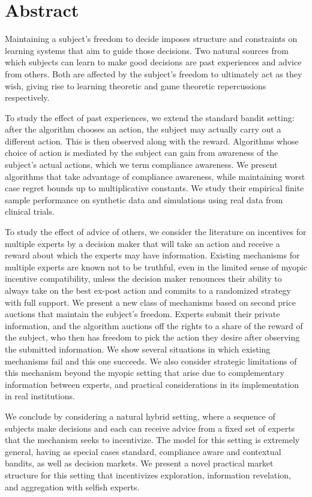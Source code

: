 \chapter*{Abstract}
\vspace{-1em}


Maintaining a subject's freedom to decide imposes structure and constraints on learning systems that aim to guide those decisions. Two natural sources from which subjects can learn to make good decisions are past experiences and advice from others. Both are affected by the subject's freedom to ultimately act as they wish, giving rise to learning theoretic and game theoretic repercussions respectively.

To study the effect of past experiences, we extend the standard bandit setting: after the algorithm chooses an action, the subject may actually carry out a different action. This is then observed along with the reward. Algorithms whose choice of action is mediated by the subject can gain from awareness of the subject's actual actions, which we term compliance awareness. We present algorithms that take advantage of compliance awareness, while maintaining worst case regret bounds up to multiplicative constants. We study their empirical finite sample performance on synthetic data and simulations using real data from clinical trials.

To study the effect of advice of others, we consider the literature on incentives for multiple experts by a decision maker that will take an action and receive a reward about which the experts may have information. Existing mechanisms for multiple experts are known not to be truthful, even in the limited sense of myopic incentive compatibility, unless the decision maker renounces their ability to always take on the best ex-post action and commits to a randomized strategy with full support. We present a new class of mechanisms based on second price auctions that maintain the subject's freedom. Experts submit their private information, and the algorithm auctions off the rights to a share of the reward of the subject, who then has freedom to pick the action they desire after observing the submitted information. We show several situations in which existing mechanisms fail and this one succeeds. We also consider strategic limitations of this mechanism beyond the myopic setting that arise due to complementary information between experts, and practical considerations in its implementation in real institutions.


We conclude by considering a natural hybrid setting, where a sequence of subjects make decisions and each can receive advice from a fixed set of experts that the mechanism seeks to incentivize.
The model for this setting is extremely general, having as special cases standard, compliance aware and contextual bandits, as well as decision markets.
We present a novel practical market structure for this setting that incentivizes exploration, information revelation, and aggregation with selfish experts.



